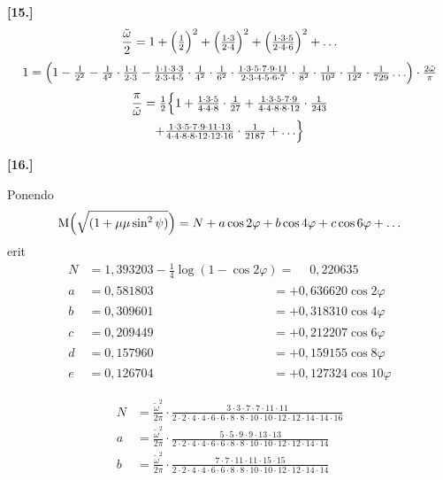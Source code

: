 \documentclass[10pt,a4paper]{article}
\newcommand{\M}{\text{M}}
\begin{document}
\medskip
\noindent\textbf{[15.]}
\[
\frac{\tilde{\omega}}{2} = 1 + \Bigl(\tfrac{1}{2}\Bigr)^2 + \Bigl(\tfrac{1\cdot3}{2\cdot4}\Bigr)^2 + \Bigl(\tfrac{1\cdot3\cdot5}{2\cdot4\cdot6}\Bigr)^2 + \ldots
\]
\[
1 = \Bigl(1-\tfrac{1}{2^2}-\tfrac{1}{4^2}\cdot\tfrac{1\cdot1}{2\cdot3}-\tfrac{1\cdot1\cdot3\cdot3}{2\cdot3\cdot4\cdot5}\cdot\tfrac{1}{4^2}\cdot\tfrac{1}{6^2}\cdot\tfrac{1\cdot3\cdot5\cdot7\cdot9\cdot11}{2\cdot3\cdot4\cdot5\cdot6\cdot7}\cdot\tfrac{1}{8^2}\cdot\tfrac{1}{10^2}\cdot\tfrac{1}{12^2}\cdot\tfrac{1}{729}\ldots\Bigr)\cdot\tfrac{2\tilde{\omega}}{\pi}
\]
\begin{multline*}
\frac{\pi}{\tilde{\omega}} = \tfrac12\Bigl\{1 + \tfrac{1\cdot3\cdot5}{4\cdot4\cdot8}\cdot\tfrac{1}{27} + \tfrac{1\cdot3\cdot5\cdot7\cdot9}{4\cdot4\cdot8\cdot8\cdot12}\cdot\tfrac{1}{243}\\
+ \tfrac{1\cdot3\cdot5\cdot7\cdot9\cdot11\cdot13}{4\cdot4\cdot8\cdot8\cdot12\cdot12\cdot16}\cdot\tfrac{1}{2187} + \ldots\Bigr\}
\end{multline*}

\medskip
\noindent\textbf{[16.]}

Ponendo
\[
\M\Bigl(\sqrt{(1+\mu\mu\sin^2\psi)}\Bigr) = N + a\cos 2\varphi + b\cos 4\varphi + c\cos 6\varphi + \ldots
\]
erit
\begin{align*}
N &= 1{,}393203 - \tfrac{1}{4}\log(1-\cos 2\varphi) = \phantom{+}0{,}220635\\
a &= 0{,}581803 \phantom{- \tfrac{1}{4}\log(1-\cos 2\varphi)} = +0{,}636620\cos 2\varphi\\
b &= 0{,}309601 \phantom{- \tfrac{1}{4}\log(1-\cos 2\varphi)} = +0{,}318310\cos 4\varphi\\
c &= 0{,}209449 \phantom{- \tfrac{1}{4}\log(1-\cos 2\varphi)} = +0{,}212207\cos 6\varphi\\
d &= 0{,}157960 \phantom{- \tfrac{1}{4}\log(1-\cos 2\varphi)} = +0{,}159155\cos 8\varphi\\
e &= 0{,}126704 \phantom{- \tfrac{1}{4}\log(1-\cos 2\varphi)} = +0{,}127324\cos 10\varphi
\end{align*}

\begin{align*}
N &= \frac{\tilde{\omega}^2}{2\pi}\cdot\frac{3\cdot3\cdot7\cdot7\cdot11\cdot11}{2\cdot2\cdot4\cdot4\cdot6\cdot6\cdot8\cdot8\cdot10\cdot10\cdot12\cdot12\cdot14\cdot14\cdot16}\\
a &= \frac{\tilde{\omega}^2}{2\pi}\cdot\frac{5\cdot5\cdot9\cdot9\cdot13\cdot13}{2\cdot2\cdot4\cdot4\cdot6\cdot6\cdot8\cdot8\cdot10\cdot10\cdot12\cdot12\cdot14\cdot14}\\
b &= \frac{\tilde{\omega}^2}{2\pi}\cdot\frac{7\cdot7\cdot11\cdot11\cdot15\cdot15}{2\cdot2\cdot4\cdot4\cdot6\cdot6\cdot8\cdot8\cdot10\cdot10\cdot12\cdot12\cdot14\cdot14}
\end{align*}
\end{document}
